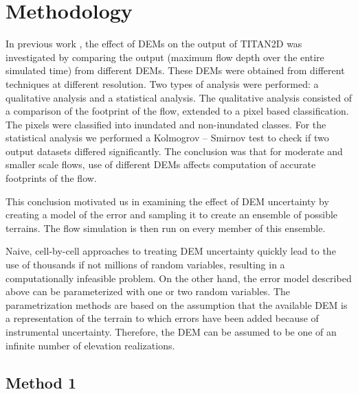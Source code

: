 \documentclass{article}
\begin{document}
\section{Methodology}

In previous work \citep{stefanescu1}, the effect of DEMs on the output
of TITAN2D %
was investigated by comparing the output
(maximum flow depth over the entire simulated time) from different
DEMs.  These DEMs were obtained from different techniques at different
resolution. Two types of analysis were performed: a qualitative
analysis and a statistical analysis. The qualitative analysis
consisted of a comparison of the footprint of the flow, extended to a
pixel based classification. The pixels were classified into inundated
and non-inundated classes. For the statistical analysis we performed a
Kolmogrov -- Smirnov test to check if two output datasets differed
significantly. The conclusion was that for moderate and smaller scale
flows, use of different DEMs affects computation of accurate
footprints of the flow.

This conclusion motivated us in examining the effect of DEM
uncertainty by creating a model of the error and sampling it to create
an ensemble of possible terrains.  The flow simulation is then run on
every member of this ensemble.

Naive, cell-by-cell approaches to treating DEM uncertainty quickly
lead to the use of thousands if not millions of random variables,
resulting in a computationally infeasible problem.  On the other hand,
the error model described above can be parameterized with one or two
random variables.  The parametrization methods are based on the
assumption that the available DEM is a representation of the terrain
to which errors have been added because of instrumental uncertainty.
Therefore, the DEM can be assumed to be one of an infinite number of
elevation realizations.


\subsection{Method 1}
\label{Method1}
\end{document}
